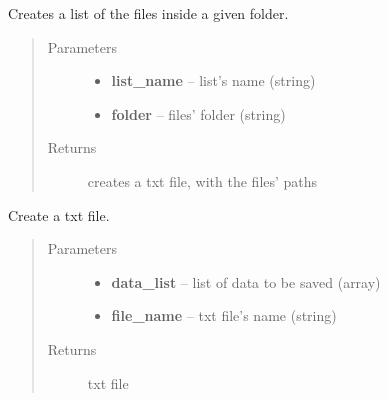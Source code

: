 \documentclass[letterpaper,10pt,english]{sphinxmanual}
\begin{document}
\begin{fulllineitems}
\label{index:BeFaVOr_web.create_list_files}
Creates a list of the files inside a given folder.
\begin{quote}\begin{description}
\item[{Parameters}] \leavevmode\begin{itemize}
\item {} 
\textbf{list\_name} -- list's name (string)

\item {} 
\textbf{folder} -- files' folder (string)

\end{itemize}

\item[{Returns}] \leavevmode
creates a txt file, with the files' paths

\end{description}\end{quote}

\end{fulllineitems}


\begin{fulllineitems}
\label{index:BeFaVOr_web.create_txt_file}
Create a txt file.
\begin{quote}\begin{description}
\item[{Parameters}] \leavevmode\begin{itemize}
\item {} 
\textbf{data\_list} -- list of data to be saved (array)

\item {} 
\textbf{file\_name} -- txt file's name (string)

\end{itemize}

\item[{Returns}] \leavevmode
txt file

\end{description}\end{quote}

\end{fulllineitems}
\end{document}
